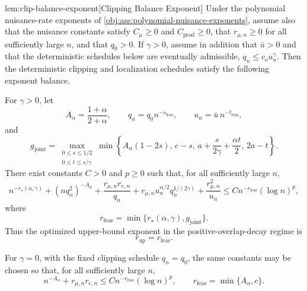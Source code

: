 \begin{lemmav}{lem:clip-balance-exponent}[Clipping Balance Exponent]
Under the polynomial nuisance-rate exponents of \cref{obj:ass:polynomial-nuisance-exponents}, assume also that the nuisance constants satisfy \(C_\mu\ge0\) and \(C_{\mathrm{prod}}\ge0\), that \(r_{\mu,n}\ge0\) for all sufficiently large \(n\), and that \(q_0>0\).  If \(\gamma>0\), assume in addition that \(\bar u>0\) and that the deterministic schedules below are eventually admissible, \(q_n\le c_o u_n^\gamma\).  Then the deterministic clipping and localization schedules satisfy the following exponent balance.

For \(\gamma>0\), let
\[
A_\alpha=\frac{1+\alpha}{2+\alpha},
\qquad
q_n=q_0 n^{-s_{\mathrm{feas}}},
\qquad
u_n=\bar u\, n^{-t_{\mathrm{feas}}},
\]
and
\[
g_{\mathrm{joint}}
=
\max_{\substack{0\le s\le 1/2\\ 0\le t\le s/\gamma}}
\min\left\{
A_\alpha(1-2s),\,
c-s,\,
a+\frac{s}{2\gamma}+\frac{\alpha t}{2},\,
2a-t
\right\}.
\]
There exist constants \(C>0\) and \(p\ge0\) such that, for all sufficiently large \(n\),
\[
 n^{-r_\star(\alpha,\gamma)}
 + (nq_n^2)^{-A_\alpha}
 + \frac{r_{\mu,n}r_{e,n}}{q_n}
 + r_{\mu,n}u_n^{\alpha/2}q_n^{1/(2\gamma)}
 + \frac{r_{\mu,n}^2}{u_n}
\le
C n^{-r_{\mathrm{feas}}}(\log n)^p,
\]
where
\[
r_{\mathrm{feas}}
=
\min\{r_\star(\alpha,\gamma),g_{\mathrm{joint}}\}.
\]
Thus the optimized upper-bound exponent in the positive-overlap-decay regime is
\[
r_{\mathrm{up}}=r_{\mathrm{feas}}.
\]

For \(\gamma=0\), with the fixed clipping schedule \(q_n=q_0\), the same constants may be chosen so that, for all sufficiently large \(n\),
\[
n^{-A_\alpha}+r_{\mu,n}r_{e,n}
\le
C n^{-r_{\mathrm{feas}}}(\log n)^p,
\qquad
r_{\mathrm{feas}}=\min\{A_\alpha,c\}.
\]
\end{lemmav}

